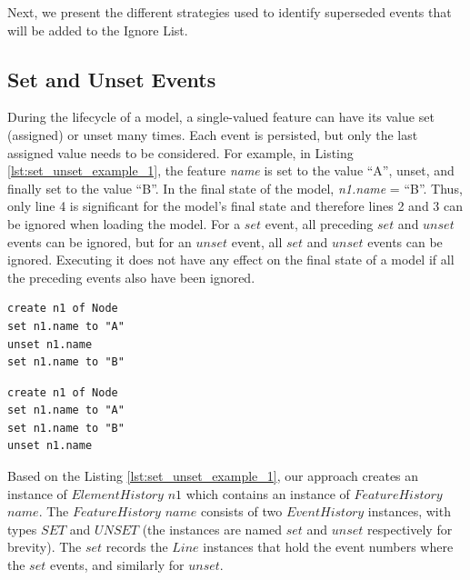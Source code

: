 \documentclass{llncs}
\begin{document}
    Next, we present the different strategies used to identify superseded events that will be added to the Ignore List.   
    
    \vspace{-10pt}
    \subsection{Set and Unset Events}
    \label{subsec:set_and_unset_operations}
    During the lifecycle of a model, a single-valued feature can have its value set (assigned) or unset many times. Each event is persisted, but only the last assigned value needs to be considered. For example, in Listing \ref{lst:set_unset_example_1}, the feature \emph{name} is set to the value ``A'', unset, and finally set to the value ``B''.  In the final state of the model, \emph{n1.name} = ``B''. Thus, only line 4 is significant for the model's final state and therefore lines 2 and 3 can be ignored when loading the model. For a $set$ event, all preceding $set$ and $unset$ events can be ignored, but for an $unset$ event, all $set$ and $unset$ events can be ignored. Executing it does not have any effect on the final state of a model if all the preceding events also have been ignored.
    
    \vspace{-10pt}
    \begin{minipage}[t]{0.49\linewidth}
\begin{lstlisting}[style=eol,caption={A CBP representation of attribute \emph{name} assignments.},label=lst:set_unset_example_1]
create n1 of Node
set n1.name to "A"
unset n1.name
set n1.name to "B"
\end{lstlisting}
    \end{minipage}
    \hfill
    \begin{minipage}[t]{0.49\linewidth}
\begin{lstlisting}[style=eol,caption={A CBP representation of attribute \emph{name} assignments.},label=lst:set_unset_example_2]
create n1 of Node
set n1.name to "A"
set n1.name to "B"
unset n1.name
\end{lstlisting}
    \end{minipage}
    
    Based on the Listing \ref{lst:set_unset_example_1}, our approach creates an instance of $ElementHistory$ $n1$ which contains an instance of $FeatureHistory$ $name$. The $FeatureHistory$ $name$ consists of two $EventHistory$ instances, with types $SET$ and $UNSET$ (the instances are named $set$ and $unset$ respectively for brevity). The $set$ records the $Line$ instances that hold the event numbers where the $set$ events, and similarly for $unset$.
    
\end{document}
